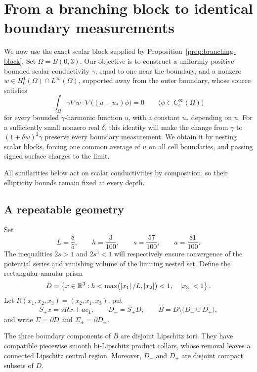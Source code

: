 \section{From a branching block to identical boundary measurements}
\label{sec:nonuniqueness}

We now use the exact scalar block supplied by
Proposition~\ref{prop:branching-block}. Set \(\Omega=B(0,3)\).
Our objective is to construct a uniformly positive bounded scalar
conductivity \(\gamma\), equal to one near the boundary, and a nonzero
\(w\in H^1_0(\Omega)\cap L^\infty(\Omega)\), supported away from the
outer boundary, whose source satisfies
\[
 \int_\Omega\gamma\nabla w\cdot
       \nabla\bigl((u-u_*)\phi\bigr)=0
 \qquad\bigl(\phi\in C_c^\infty(\Omega)\bigr)
\]
for every bounded \(\gamma\)-harmonic function \(u\), with a constant
\(u_*\) depending on \(u\). For a sufficiently small nonzero real
\(\delta\), this identity will make the change from \(\gamma\) to
\((1+\delta w)^2\gamma\) preserve every boundary measurement.
We obtain it by nesting scalar blocks, forcing one common
average of \(u\) on all cell boundaries, and passing signed surface
charges to the limit.

All similarities below act on scalar conductivities by composition, so
their ellipticity bounds remain fixed at every depth.

\subsection{A repeatable geometry}

Set
\begin{equation}\label{nu:parameters}
 L=\frac85,\qquad h=\frac3{100},\qquad
 s=\frac{57}{100},\qquad a=\frac{81}{100}.
\end{equation}
The inequalities $2s>1$ and $2s^3<1$ will respectively ensure
convergence of the potential series and vanishing volume of the
limiting nested set. Define the rectangular annular prism
\begin{equation}\label{nu:parent}
 D=\left\{x\in\mathbb R^3:
 h<\max\bigl(\left\lvert x_1\right\rvert/L,\left\lvert x_2\right\rvert\bigr)<1,
 \quad \left\lvert x_3\right\rvert<1\right\}.
\end{equation}
Let \(R(x_1,x_2,x_3)=(x_2,x_1,x_3)\), put
\[
 S_\pm x=sRx\pm a e_1,\qquad D_\pm=S_\pm D,
 \qquad B=D\setminus\bigl(\overline{D_-}\cup\overline{D_+}\bigr),
\]
and write \(\Sigma=\partial D\) and
\(\Sigma_\pm=\partial D_\pm\).

\begin{lemma}\label{nu:geometry}
The three boundary components of \(B\) are disjoint Lipschitz tori.
They have compatible piecewise smooth bi-Lipschitz product collars,
whose removal leaves a connected Lipschitz central region. Moreover,
\(\overline{D_-}\) and \(\overline{D_+}\) are disjoint compact subsets
of \(D\).
\end{lemma}

